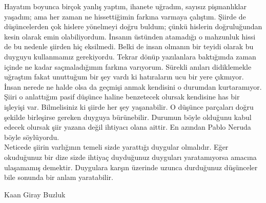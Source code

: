 Hayatım boyunca birçok yanlış yaptım, ihanete uğradım, sayısız pişmanlıklar yaşadım; ama her zaman ne hissettiğimin farkına varmaya çalıştım. Şiirde de düşüncelerden çok hislere yönelmeyi doğru buldum; çünkü hislerin doğruluğundan kesin olarak emin olabiliyordum. İnsanın üstünden atamadığı o mahzunluk hissi de bu nedenle şiirden hiç eksilmedi. Belki de insan olmanın bir teyidi olarak bu duyguyu kullanmamız gerekiyordu.
Tekrar dönüp yazılanlara baktığımda zaman içinde ne kadar saçmaladığımın farkına varıyorum. Sürekli anıları didiklemekle uğraştım fakat unuttuğum bir şey vardı ki hatıraların ucu bir yere çıkmıyor. İnsan nerede ne halde olsa da geçmişi anmak kendisini o durumdan kurtaramıyor. Şiiri o anlattığım pasif düşünce haline benzetecek olursak kendisine has bir işleyişi var. Bilmelisiniz ki şiirde her şey yaşanabilir. O düşünce parçaları doğru şekilde birleşirse gereken duyguya bürünebilir. Durumun böyle olduğunu kabul edecek olursak şiir yazana değil ihtiyacı olana aittir. En azından Pablo Neruda böyle söylüyordu.\\

Neticede şiirin varlığının temeli sizde yarattığı duygular olmalıdır. Eğer okuduğunuz bir dize sizde ihtiyaç duyduğunuz duyguları yaratamıyorsa amacına ulaşamamış demektir. Duygulara karşın üzerinde uzunca durduğunuz düşünceler bile sonunda bir anlam yaratabilir.

\begin{flushright}
    Kaan Giray Buzluk
\end{flushright}